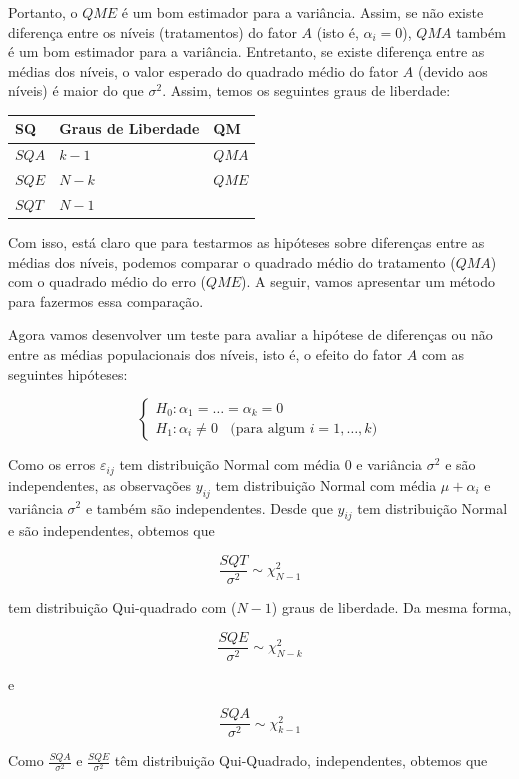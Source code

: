 \documentclass[
]{book}
\begin{document}
Portanto, o \(QME\) é um bom estimador para a variância. Assim, se não existe diferença entre os níveis (tratamentos) do fator \(A\) (isto é, \(\alpha_i=0\)), \(QMA\) também é um bom estimador para a variância. Entretanto, se existe diferença entre as médias dos níveis, o valor esperado do quadrado médio do fator \(A\) (devido aos níveis) é maior do que \(\sigma^2\). Assim, temos os seguintes graus de liberdade:

\begin{longtable}[]{@{}lll@{}}
\toprule
SQ & Graus de Liberdade & QM \\
\midrule
\endhead
\(SQA\) & \(k-1\) & \(QMA\) \\
\(SQE\) & \(N-k\) & \(QME\) \\
\(SQT\) & \(N-1\) & \\
\bottomrule
\end{longtable}

Com isso, está claro que para testarmos as hipóteses sobre diferenças entre as médias dos níveis, podemos comparar o quadrado médio do tratamento (\(QMA\)) com o quadrado médio do erro (\(QME\)). A seguir, vamos apresentar um método para fazermos essa comparação.

Agora vamos desenvolver um teste para avaliar a hipótese de diferenças ou não entre as médias populacionais dos níveis, isto é, o efeito do fator \(A\) com as seguintes hipóteses:

\[
\begin{cases} 
H_0: \alpha_1=\ldots=\alpha_k=0 \\
H_1:\alpha_i\neq 0~~~~\text{(para algum }i=1,\ldots,k\text{)}
\end{cases}
\]

Como os erros \(\varepsilon_{ij}\) tem distribuição Normal com média \(0\) e variância \(\sigma^2\) e são independentes, as observações \(y_{ij}\) tem distribuição Normal com média \(\mu+\alpha_i\) e variância \(\sigma^2\) e também são independentes. Desde que \(y_{ij}\) tem distribuição Normal e são independentes, obtemos que

\[\frac{SQT}{\sigma^2}\sim \chi^2_{N-1}\]

tem distribuição Qui-quadrado com (\(N-1\)) graus de liberdade. Da mesma forma,

\[\frac{SQE}{\sigma^2}\sim \chi^2_{N-k}\]

e

\[\frac{SQA}{\sigma^2}\sim \chi^2_{k-1}\]

Como \(\frac{SQA}{\sigma^2}\) e \(\frac{SQE}{\sigma^2}\) têm distribuição Qui-Quadrado, independentes, obtemos que
\end{document}
